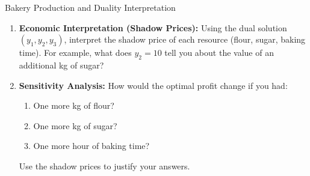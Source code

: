 \begin{ex}{Bakery Production and Duality Interpretation}{}
\begin{enumerate}
  \item \textbf{Economic Interpretation (Shadow Prices):}  
  Using the dual solution $(y_1, y_2, y_3)$, interpret the shadow price of each resource (flour, sugar, baking time). For example, what does $y_2 = 10$ tell you about the value of an additional kg of sugar?

  \item \textbf{Sensitivity Analysis:}  
  How would the optimal profit change if you had:
  \begin{enumerate}
    \item One more kg of flour?
    \item One more kg of sugar?
    \item One more hour of baking time?
  \end{enumerate}
  Use the shadow prices to justify your answers.
\end{enumerate}
\end{ex}




